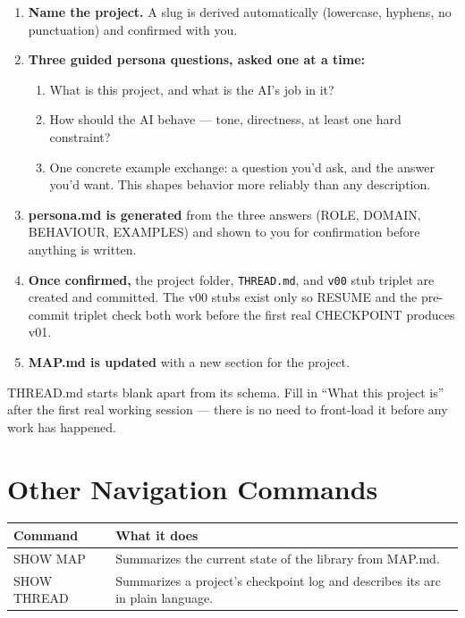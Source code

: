 \documentclass[12pt,letterpaper]{article}
\begin{document}
\begin{mdframed}[style=stepbox]
\begin{enumerate}
\item \textbf{Name the project.} A slug is derived automatically
      (lowercase, hyphens, no punctuation) and confirmed with you.
\item \textbf{Three guided persona questions, asked one at a time:}
      \begin{enumerate}
      \item What is this project, and what is the AI's job in it?
      \item How should the AI behave --- tone, directness, at least one
            hard constraint?
      \item One concrete example exchange: a question you'd ask, and the
            answer you'd want. This shapes behavior more reliably than
            any description.
      \end{enumerate}
\item \textbf{persona.md is generated} from the three answers (ROLE,
      DOMAIN, BEHAVIOUR, EXAMPLES) and shown to you for confirmation
      before anything is written.
\item \textbf{Once confirmed,} the project folder, \texttt{THREAD.md},
      and \texttt{v00} stub triplet are created and committed. The v00
      stubs exist only so RESUME and the pre-commit triplet check both
      work before the first real CHECKPOINT produces v01.
\item \textbf{MAP.md is updated} with a new section for the project.
\end{enumerate}
\end{mdframed}

THREAD.md starts blank apart from its schema. Fill in ``What this project
is'' after the first real working session --- there is no need to
front-load it before any work has happened.

\section{Other Navigation Commands}

\begin{center}
\begin{tabular}{@{}lp{8.5cm}@{}}
\toprule
\textbf{Command} & \textbf{What it does} \\
\midrule
SHOW MAP & Summarizes the current state of the library from MAP.md. \\
SHOW THREAD & Summarizes a project's checkpoint log and describes its
arc in plain language. \\
\bottomrule
\end{tabular}
\end{center}
\end{document}
